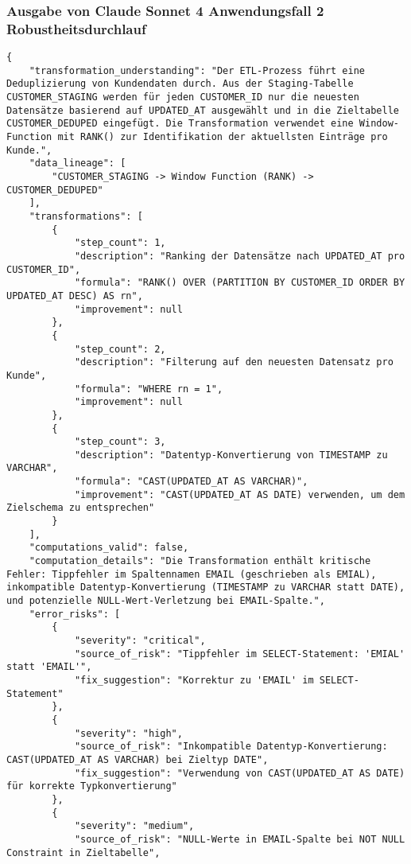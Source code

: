 \subsubsection{Ausgabe von Claude Sonnet 4 Anwendungsfall 2 Robustheitsdurchlauf}\label{anhang:subsubsec:claude_case2_prompt3}
\begin{lstlisting}[caption={Ausgabe: Claude Sonnet 4 Anwendungsfall 2 Robustheitsdurchlauf},label={claude_case2_prompt3}]
{
    "transformation_understanding": "Der ETL-Prozess führt eine Deduplizierung von Kundendaten durch. Aus der Staging-Tabelle CUSTOMER_STAGING werden für jeden CUSTOMER_ID nur die neuesten Datensätze basierend auf UPDATED_AT ausgewählt und in die Zieltabelle CUSTOMER_DEDUPED eingefügt. Die Transformation verwendet eine Window-Function mit RANK() zur Identifikation der aktuellsten Einträge pro Kunde.",
    "data_lineage": [
        "CUSTOMER_STAGING -> Window Function (RANK) -> CUSTOMER_DEDUPED"
    ],
    "transformations": [
        {
            "step_count": 1,
            "description": "Ranking der Datensätze nach UPDATED_AT pro CUSTOMER_ID",
            "formula": "RANK() OVER (PARTITION BY CUSTOMER_ID ORDER BY UPDATED_AT DESC) AS rn",
            "improvement": null
        },
        {
            "step_count": 2,
            "description": "Filterung auf den neuesten Datensatz pro Kunde",
            "formula": "WHERE rn = 1",
            "improvement": null
        },
        {
            "step_count": 3,
            "description": "Datentyp-Konvertierung von TIMESTAMP zu VARCHAR",
            "formula": "CAST(UPDATED_AT AS VARCHAR)",
            "improvement": "CAST(UPDATED_AT AS DATE) verwenden, um dem Zielschema zu entsprechen"
        }
    ],
    "computations_valid": false,
    "computation_details": "Die Transformation enthält kritische Fehler: Tippfehler im Spaltennamen EMAIL (geschrieben als EMIAL), inkompatible Datentyp-Konvertierung (TIMESTAMP zu VARCHAR statt DATE), und potenzielle NULL-Wert-Verletzung bei EMAIL-Spalte.",
    "error_risks": [
        {
            "severity": "critical",
            "source_of_risk": "Tippfehler im SELECT-Statement: 'EMIAL' statt 'EMAIL'",
            "fix_suggestion": "Korrektur zu 'EMAIL' im SELECT-Statement"
        },
        {
            "severity": "high",
            "source_of_risk": "Inkompatible Datentyp-Konvertierung: CAST(UPDATED_AT AS VARCHAR) bei Zieltyp DATE",
            "fix_suggestion": "Verwendung von CAST(UPDATED_AT AS DATE) für korrekte Typkonvertierung"
        },
        {
            "severity": "medium",
            "source_of_risk": "NULL-Werte in EMAIL-Spalte bei NOT NULL Constraint in Zieltabelle",

\end{lstlisting}
